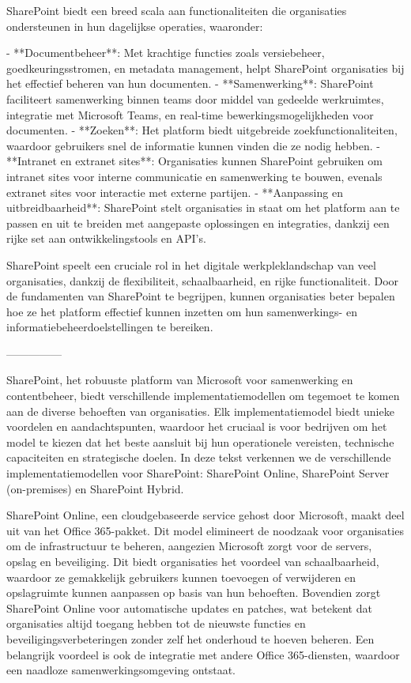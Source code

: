 \subtitle{Kernfunctionaliteiten}

SharePoint biedt een breed scala aan functionaliteiten die organisaties ondersteunen in hun dagelijkse operaties, waaronder:

- **Documentbeheer**: Met krachtige functies zoals versiebeheer, goedkeuringsstromen, en metadata management, helpt SharePoint organisaties bij het effectief beheren van hun documenten.
- **Samenwerking**: SharePoint faciliteert samenwerking binnen teams door middel van gedeelde werkruimtes, integratie met Microsoft Teams, en real-time bewerkingsmogelijkheden voor documenten.
- **Zoeken**: Het platform biedt uitgebreide zoekfunctionaliteiten, waardoor gebruikers snel de informatie kunnen vinden die ze nodig hebben.
- **Intranet en extranet sites**: Organisaties kunnen SharePoint gebruiken om intranet sites voor interne communicatie en samenwerking te bouwen, evenals extranet sites voor interactie met externe partijen.
- **Aanpassing en uitbreidbaarheid**: SharePoint stelt organisaties in staat om het platform aan te passen en uit te breiden met aangepaste oplossingen en integraties, dankzij een rijke set aan ontwikkelingstools en API's.

SharePoint speelt een cruciale rol in het digitale werkpleklandschap van veel organisaties, dankzij de flexibiliteit, schaalbaarheid, en rijke functionaliteit. Door de fundamenten van SharePoint te begrijpen, kunnen organisaties beter bepalen hoe ze het platform effectief kunnen inzetten om hun samenwerkings- en informatiebeheerdoelstellingen te bereiken.

---------------

\subtitle{Deployment models}
SharePoint, het robuuste platform van Microsoft voor samenwerking en contentbeheer, biedt verschillende implementatiemodellen om tegemoet te komen aan de diverse behoeften van organisaties. Elk implementatiemodel biedt unieke voordelen en aandachtspunten, waardoor het cruciaal is voor bedrijven om het model te kiezen dat het beste aansluit bij hun operationele vereisten, technische capaciteiten en strategische doelen. In deze tekst verkennen we de verschillende implementatiemodellen voor SharePoint: SharePoint Online, SharePoint Server (on-premises) en SharePoint Hybrid.

\subtitle{SharePoint Online}
SharePoint Online, een cloudgebaseerde service gehost door Microsoft, maakt deel uit van het Office 365-pakket. Dit model elimineert de noodzaak voor organisaties om de infrastructuur te beheren, aangezien Microsoft zorgt voor de servers, opslag en beveiliging. Dit biedt organisaties het voordeel van schaalbaarheid, waardoor ze gemakkelijk gebruikers kunnen toevoegen of verwijderen en opslagruimte kunnen aanpassen op basis van hun behoeften. Bovendien zorgt SharePoint Online voor automatische updates en patches, wat betekent dat organisaties altijd toegang hebben tot de nieuwste functies en beveiligingsverbeteringen zonder zelf het onderhoud te hoeven beheren. Een belangrijk voordeel is ook de integratie met andere Office 365-diensten, waardoor een naadloze samenwerkingsomgeving ontstaat.


